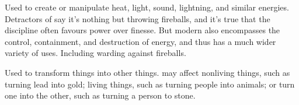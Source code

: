 
Used to create or manipulate heat, light, sound, lightning, and similar energies.
Detractors of  say it's nothing but throwing fireballs, and it's true that the discipline often favours power over finesse.
But modern  also encompasses the control, containment, and destruction of energy, and thus has a much wider variety of uses.
Including warding against fireballs.


Used to transform things into other things.
 may affect nonliving things, such as turning lead into gold; living things, such as turning people into animals; or turn one into the other, such as turning a person to stone.

